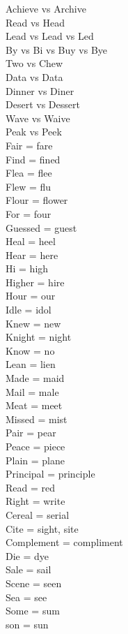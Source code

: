 \documentclass[12pt,a4paper]{article} %
\begin{document}
	Achieve vs Archive\\
	Read vs Head\\
	Lead vs Lead vs Led\\
	By vs Bi vs Buy vs Bye\\
	Two vs Chew\\
	Data vs Data\\
	Dinner vs Diner\\
	Desert vs Dessert\\
	Wave vs Waive\\
	Peak vs Peek\\
	
	Fair = fare\\
	Find = fined\\
	Flea = flee\\
	Flew = flu\\
	Flour = flower\\
	For = four\\
	Guessed = guest\\
	Heal = heel\\
	Hear = here\\
	Hi = high\\
	Higher = hire\\
	Hour = our\\
	Idle = idol\\
	Knew = new\\
	Knight = night\\
	Know = no\\
	Lean = lien\\
	Made = maid\\
	Mail = male\\
	Meat = meet\\
	Missed = mist\\
	Pair = pear\\
	Peace = piece\\
	Plain = plane\\
	Principal = principle\\
	Read = red\\
	Right = write\\
	Cereal = serial\\
	Cite = sight, site\\
	Complement = compliment\\
	Die = dye\\
	Sale = sail\\
	Scene = seen\\
	Sea = see\\
	Some = sum\\
	son = sun\\
\end{document}
